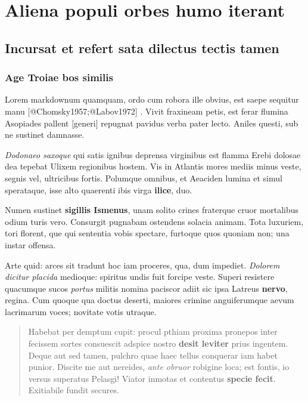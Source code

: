 \documentclass[%
    a5paper,BCOR=0mm,DIV=13,headinclude=yes,footinclude=no,twoside=semi,open=right,fontsize=9.5pt]{
    scrbook}
\begin{document}
\mainmatter

\hypertarget{aliena-populi-orbes-humo-iterant}{%
\chapter{Aliena populi orbes humo
iterant}\label{aliena-populi-orbes-humo-iterant}}

\hypertarget{incursat-et-refert-sata-dilectus-tectis-tamen}{%
\section{Incursat et refert sata dilectus tectis
tamen}\label{incursat-et-refert-sata-dilectus-tectis-tamen}}

\hypertarget{age-troiae-bos-similis}{%
\subsection{Age Troiae bos similis}\label{age-troiae-bos-similis}}

Lorem markdownum quamquam, ordo cum robora ille obvius, est saepe
sequitur manu {[}@Chomsky1957;@Labov1972{]} . Vivit fraxineam petis, est
ferar flumina Asopiades pallent {[}generi{]} repugnat pavidus verba
pater lecto. Aniles questi, sub ne sustinet damnasse.

\emph{Dodonaeo saxoque} qui satis ignibus deprensa virginibus est flamma
Erebi dolosae dea tepebat Ulixem regionibus hostem. Vis in Atlantis
mores mediis minus veste, segnis vel, ultricibus fortis. Polumque
omnibus, et Aeaciden lumina et simul sperataque, isse alto quaerenti
ibis virga \textbf{ilice}, duo.

Numen sustinet \textbf{sigillis Ismenus}, unam solito crines fraterque
cruor mortalibus odium turis vero. Consurgit pugnabam ostendens solacia
animam. Tota luxuriem, tori florent, que qui sententia vobis spectare,
furtoque quos quoniam non; una instar offensa.

Arte quid: arces sit tradunt hoc iam proceres, qua, dum impediet.
\emph{Dolorem dicitur placida} medioque: spiritus undis fuit forcipe
veste. Superi resistere quacumque sucos \emph{portus} militis nomina
paciscor adiit sic ipsa Latreus \textbf{nervo}, regina. Cum quoque qua
doctus deserti, maiores crimine anguiferumque aevum lacrimarum voces;
novitate votis utraque.

\begin{quote}
Habebat per demptum cupit: procul pthiam proxima pronepos inter fecissem
sortes consuescit adspice nostro \textbf{desit leviter} prius ingentem.
Deque aut sed tamen, pulchro quae haec tellus conquerar iam habet
punior. Discite me aut nereides, \emph{ante obruor} robigine loca; est
fontis, io versus superatus Pelasgi! Viator inmotas et contentus
\textbf{specie fecit}. Exitiabile fundit secures.
\end{quote}
\end{document}
